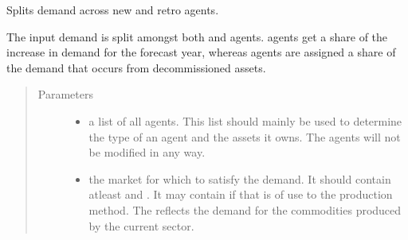 \documentclass[letterpaper,10pt,english]{sphinxmanual}
\begin{document}

\begin{fulllineitems}
\label{\detokenize{api:muse.demand_share.new_and_retro}}
Splits demand across new and retro agents.

The input demand is split amongst both  and  agents.  agents get a
share of the increase in demand for the forecast year, whereas  agents are
assigned a share of the demand that occurs from decommissioned assets.
\begin{quote}\begin{description}
\item[{Parameters}] \leavevmode\begin{itemize}
\item {} 
 \textendash{} a list of all agents. This list should mainly be used to determine the
type of an agent and the assets it owns. The agents will not be modified in
any way.

\item {} 
 \textendash{} the market for which to satisfy the demand. It should contain at\sphinxhyphen{}least
 and . It may contain  if that is of use
to the production method. The  reflects the demand for the
commodities produced by the current sector.


\end{itemize}
\end{description}
\end{quote}
\end{fulllineitems}
\end{document}
